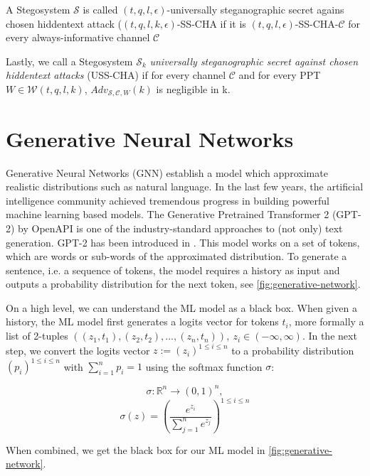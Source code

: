 \begin{definition}
A Stegosystem $\mathcal{S}$ is called $(t, q, l, \epsilon)$-universally steganographic secret agains chosen hiddentext attack ($(t,q,l,k,\epsilon)$-SS-CHA if it is $(t,q,l,\epsilon)$-SS-CHA-$\mathcal{C}$ for every always-informative channel $\mathcal{C}$
\end{definition}

Lastly, we call a Stegosystem $\mathcal{S}_k$ \emph{universally steganographic secret against chosen hiddentext attacks} (USS-CHA) if for every channel $\mathcal{C}$ and for every PPT $W \in \mathcal{W}(t,q,l,k)$, $Adv_{\mathcal{S},\mathcal{C},W}(k)$ is negligible in k.


\section{Generative Neural Networks}
\label{sec:generative-neural-networks}

Generative Neural Networks (GNN) establish a model which approximate realistic distributions such as natural language.
In the last few years, the artificial intelligence community achieved tremendous progress in building powerful machine learning based models.
The Generative Pretrained Transformer 2 (GPT-2) by OpenAPI is one of the industry-standard approaches to (not only) text generation.
GPT-2 has been introduced in \cite{OpenAI2019}.
This model works on a set of tokens, which are words or sub-words of the approximated distribution.
To generate a sentence, i.e. a sequence of tokens, the model requires a history as input and outputs a probability distribution for the next token, see \autoref{fig:generative-network}.

On a high level, we can understand the ML model as a black box.
When given a history, the ML model first generates a logits vector for tokens $t_i$, more formally a list of 2-tuples $((z_1, t_1), (z_2, t_2), \dots, (z_n, t_n)),~ z_i \in ( -\infty, \infty )$.
In the next step, we convert the logits vector $z := (z_i)^{1 \leq i \leq n}$ to a probability distribution $(p_i)^{1 \leq i \leq n}$ with $\sum_{i=1}^n p_i = 1$ using the softmax function $\sigma$:

$$\sigma \colon \mathbb{R}^n \rightarrow (0,1)^n,$$
$$\sigma(z) = \left(\frac{e^{z_i}}{\sum_{j=1}^n e^{z_j}}\right)^{1 \leq i \leq n}$$

When combined, we get the black box for our ML model in \autoref{fig:generative-network}.

